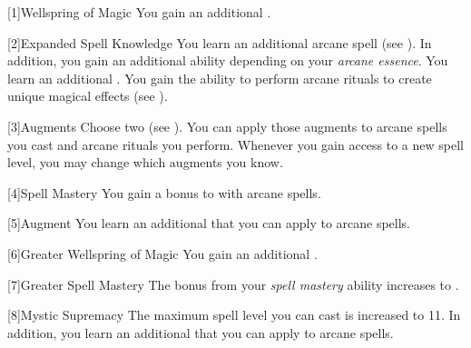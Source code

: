         [1]{Wellspring of Magic}
        You gain an additional .

        [2]{Expanded Spell Knowledge}
        You learn an additional arcane spell (see ).
        In addition, you gain an additional ability depending on your \textit{arcane essence}.
         You learn an additional .
         You gain the ability to perform arcane rituals to create unique magical effects (see ).

        [3]{Augments}
        Choose two  (see ).
        You can apply those augments to arcane spells you cast and arcane rituals you perform.
        Whenever you gain access to a new spell level, you may change which augments you know.

        [4]{Spell Mastery}
        You gain a  bonus to  with arcane spells.

        [5]{Augment}
        You learn an additional  that you can apply to arcane spells.

        [6]{Greater Wellspring of Magic}
        You gain an additional .

        [7]{Greater Spell Mastery} 
        The bonus from your \textit{spell mastery} ability increases to .

        [8]{Mystic Supremacy}
        The maximum spell level you can cast is increased to 11.
        In addition, you learn an additional  that you can apply to arcane spells.

\newpage
